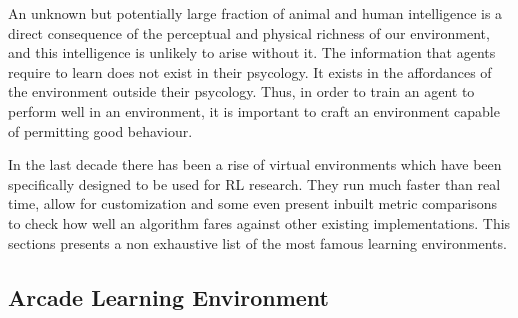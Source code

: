 An unknown but potentially large fraction of animal and human intelligence is a direct consequence of the perceptual and physical richness of our environment, and this intelligence is unlikely to arise without it. The information that agents require to learn does not exist in their psycology. It exists in the affordances of the environment outside their psycology. Thus, in order to train an agent to perform well in an environment, it is important to craft an environment capable of permitting good behaviour. 

In the last decade there has been a rise of virtual environments which have been specifically designed to be used for RL research. They run much faster than real time, allow for customization and some even present inbuilt metric comparisons to check how well an algorithm fares against other existing implementations. This sections presents a non exhaustive list of the most famous learning environments. 


\subsection{Arcade Learning Environment}

